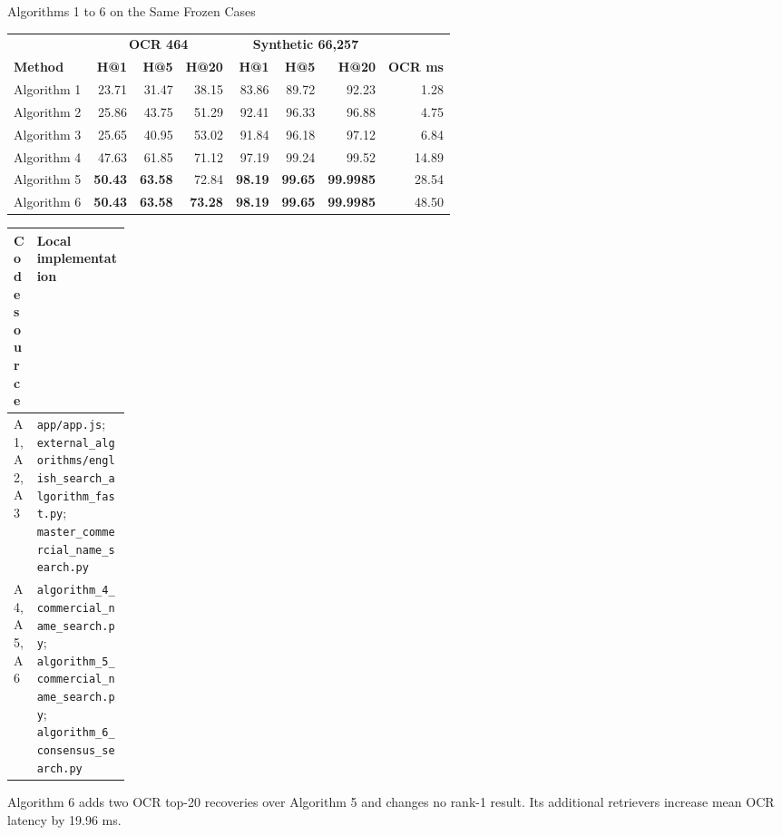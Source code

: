\documentclass[aspectratio=169,10pt]{beamer}
\newcommand{\code}[1]{\texttt{#1}}
\begin{document}
\begin{frame}{Algorithms 1 to 6 on the Same Frozen Cases}
\scriptsize
\begin{tabular}{@{}lrrrrrrr@{}}
\toprule
& \multicolumn{3}{c}{\textbf{OCR 464}} & \multicolumn{3}{c}{\textbf{Synthetic 66,257}} & \\
\cmidrule(lr){2-4}\cmidrule(lr){5-7}
\textbf{Method} & \textbf{H@1} & \textbf{H@5} & \textbf{H@20} & \textbf{H@1} & \textbf{H@5} & \textbf{H@20} & \textbf{OCR ms} \\
\midrule
Algorithm 1 & 23.71 & 31.47 & 38.15 & 83.86 & 89.72 & 92.23 & 1.28 \\
Algorithm 2 & 25.86 & 43.75 & 51.29 & 92.41 & 96.33 & 96.88 & 4.75 \\
Algorithm 3 & 25.65 & 40.95 & 53.02 & 91.84 & 96.18 & 97.12 & 6.84 \\
Algorithm 4 & 47.63 & 61.85 & 71.12 & 97.19 & 99.24 & 99.52 & 14.89 \\
Algorithm 5 & \textbf{50.43} & \textbf{63.58} & 72.84 & \textbf{98.19} & \textbf{99.65} & \textbf{99.9985} & 28.54 \\
Algorithm 6 & \textbf{50.43} & \textbf{63.58} & \textbf{73.28} & \textbf{98.19} & \textbf{99.65} & \textbf{99.9985} & 48.50 \\
\bottomrule
\end{tabular}

\vspace{2mm}
\begin{tabularx}{\linewidth}{@{}L{0.15\linewidth}Y@{}}
\toprule
\textbf{Code source} & \textbf{Local implementation} \\
\midrule
A1, A2, A3 & \code{app/app.js}; \code{external\_algorithms/english\_search\_algorithm\_fast.py}; \code{master\_commercial\_name\_search.py} \\
A4, A5, A6 & \code{algorithm\_4\_commercial\_name\_search.py}; \code{algorithm\_5\_commercial\_name\_search.py}; \code{algorithm\_6\_consensus\_search.py} \\
\bottomrule
\end{tabularx}

Algorithm 6 adds two OCR top-20 recoveries over Algorithm 5 and changes no
rank-1 result. Its additional retrievers increase mean OCR latency by 19.96 ms.
\end{frame}
\end{document}
